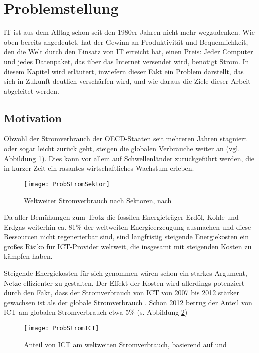 
\section{Problemstellung}

IT ist aus dem Alltag schon seit den 1980er Jahren nicht mehr wegzudenken. Wie oben bereits angedeutet, hat der Gewinn an Produktivität und Bequemlichkeit, den die Welt durch den Einsatz von IT erreicht hat, einen Preis: Jeder Computer und jedes Datenpaket, das über das Internet versendet wird, benötigt Strom. In diesem Kapitel wird erläutert, inwiefern dieser Fakt ein Problem darstellt, das sich in Zukunft deutlich verschärfen wird, und wie daraus die Ziele dieser Arbeit abgeleitet werden.

\subsection{Motivation}
Obwohl der Stromverbrauch der OECD-Staaten seit mehreren Jahren stagniert oder sogar leicht zurück geht, steigen die globalen Verbräuche weiter an (vgl. Abbildung \ref{fig:ProbStromSektor}). Dies kann vor allem auf  Schwellenländer zurückgeführt werden, die in kurzer Zeit ein rasantes wirtschaftliches Wachstum erleben.

\begin{figure}[!ht]
	\centering
	\texttt{[image: ProbStromSektor]}
	\caption{Weltweiter Stromverbrauch nach Sektoren, nach \cite{eia2016}}
	\label{fig:ProbStromSektor}
\end{figure}
Da aller Bemühungen zum Trotz die fossilen Energieträger Erdöl, Kohle und Erdgas weiterhin ca. 81\% der weltweiten Energieerzeugung ausmachen \cite{statista} und diese Ressourcen nicht regenerierbar sind, sind langfristig steigende Energiekosten \cite[40\psqq]{iea2015} ein großes Risiko für ICT-Provider weltweit, die insgesamt mit steigenden Kosten zu kämpfen haben.

Steigende Energiekosten für sich genommen wären schon ein starkes Argument, Netze effizienter zu gestalten.  Der Effekt der Kosten wird allerdings potenziert durch den Fakt, dass der Stromverbrauch von ICT von 2007 bis 2012 stärker gewachsen ist als der globale Stromverbrauch \cite[9]{vanhedde}. Schon 2012 betrug der Anteil von ICT am globalen Stromverbrauch etwa 5\% (s. Abbildung \ref{fig:ProbStromICT})

\begin{figure}[!ht]
	\centering
	\texttt{[image: ProbStromICT]}
	\caption{Anteil von ICT am weltweiten Stromverbrauch, basierend auf \cite{eia2016} und \cite{vanhsheet}}
	\label{fig:ProbStromICT}
\end{figure}

